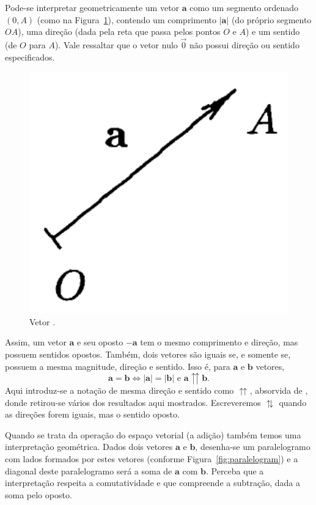 \documentclass[a4paper,12pt]{report}
\theoremstyle{plain}
\theoremstyle{definition}
\newcommand{\norm}[1]{\left| #1 \right|}
\begin{document}
	\hspace{-0.7cm}
	\begin{minipage}{0.715\linewidth}
		\setlength\parindent{24pt} Pode-se interpretar geometricamente um vetor $\mathbf a$ como um segmento ordenado $(0,A)$ (como na Figura~\ref{fig:vector}), contendo um comprimento $\norm{\mathbf a}$ (do próprio segmento $OA$), uma direção (dada pela reta que passa pelos pontos $O$ e $A$) e um sentido (de $O$ para $A$). Vale ressaltar que o vetor nulo $\vec 0$ não possui direção ou sentido especificados. 
	\end{minipage}
	\begin{minipage}{0.3\linewidth}
		\begin{figure}[H]
			\begin{center}
				\includegraphics[width=0.5\linewidth]{figures/vector.pdf}
			\end{center}\vspace{-0.7cm}
			\caption{Vetor\label{fig:vector} \cite{lounestoClifford}.}
		\end{figure}
	\end{minipage}
	
	Assim, um vetor $\mathbf a$ e seu oposto $-\mathbf a$ tem o mesmo comprimento e direção, mas possuem sentidos opostos. Também, dois vetores são iguais se, e somente se, possuem a mesma magnitude, direção e sentido. Isso é, para $\mathbf{a}$ e $\mathbf{b}$ vetores,
	$$\mathbf a = \mathbf b \iff \norm{\mathbf{a}} = \norm{\mathbf{b}} \text{ e } \mathbf{a}\upuparrows\mathbf{b}.$$
	Aqui introduz-se a notação de mesma direção e sentido como $\upuparrows$, absorvida de \cite{lounestoClifford}, donde retirou-se vários dos resultados aqui mostrados. Escreveremos $\updownarrows$ quando as direções forem iguais, mas o sentido oposto.
	
	Quando se trata da operação do espaço vetorial (a adição) também temos uma interpretação geométrica. Dados dois vetores $\mathbf a$ e $\mathbf b$, desenha-se um paralelogramo com lados formados por estes vetores (conforme Figura~\ref{fig:paralelogram}) e a diagonal deste paralelogramo será a soma de $\mathbf a$ com $\mathbf b$. Perceba que a interpretação respeita a comutatividade e que compreende a subtração, dada a soma pelo oposto.
	
\end{document}
